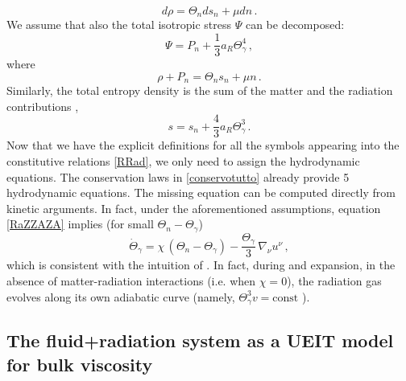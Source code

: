 \documentclass[a4paper, amsfonts, amssymb, amsmath, reprint, twocolumn, showkeys, nofootinbib]{revtex4-2}
\begin{document}
\begin{equation}
d\rho = \Theta_n ds_n + \mu dn \, .
\end{equation}
We assume that also the total isotropic stress $\Psi$ can be decomposed:
\begin{equation}\label{Psiradiuz}
\Psi = P_n + \dfrac{1}{3} a_R \Theta_\gamma^4 \, ,
\end{equation}
where
\begin{equation}
\rho + P_n = \Theta_n s_n + \mu n \, .
\end{equation}
Similarly, the total entropy density is the sum of the matter and the radiation contributions \cite{Groot1980RelativisticKT},
\begin{equation}\label{Sradiuz}
s= s_n + \dfrac{4}{3} a_R \Theta_\gamma^3 \, .
\end{equation}
Now that we have the explicit definitions for all the symbols appearing into the constitutive relations \eqref{RRad}, we only need to assign the hydrodynamic equations. The conservation laws in \eqref{conservotutto} already provide 5 hydrodynamic equations. The missing equation can be computed directly from kinetic arguments. In fact, under the aforementioned assumptions, equation \eqref{RaZZAZA} implies (for small $\Theta_n-\Theta_\gamma$)
\begin{equation}\label{thetagamma}
\dot{\Theta}_\gamma = 
\chi \, (\Theta_n-\Theta_\gamma) - \dfrac{\Theta_\gamma}{3} \,  \nabla_\nu u^\nu \, ,
\end{equation}
which is consistent with the intuition of \citet{UdeyIsrael1982}. In fact, during and expansion, in the absence of matter-radiation interactions (i.e. when $\chi=0$), the radiation gas evolves along its own adiabatic curve (namely, $\Theta_\gamma^3 v = \text{const}$ \cite{Leff2002}).


\subsection{The fluid+radiation system as a UEIT model for bulk viscosity}
\end{document}
